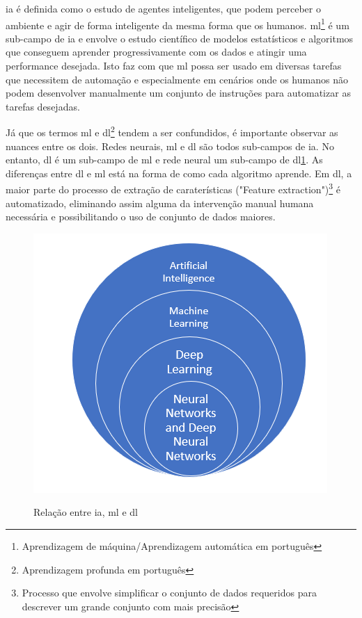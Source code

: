 \ac{ia} é definida como o estudo de agentes inteligentes, que podem perceber o ambiente e agir de forma inteligente da mesma forma que os humanos.
\ac{ml}\footnote{Aprendizagem de máquina/Aprendizagem automática em português} é um sub-campo de \ac{ia} e envolve o estudo científico de modelos estatísticos e algoritmos que conseguem aprender progressivamente com os dados e atingir uma performance desejada.
Isto faz com que \ac{ml} possa ser usado em diversas tarefas que necessitem de automação e especialmente em cenários onde os humanos não podem desenvolver manualmente um conjunto de instruções para automatizar as tarefas desejadas. 

Já que os termos \ac{ml} e \ac{dl}\footnote{Aprendizagem profunda em português} tendem a ser confundidos, é importante observar as nuances entre os dois. Redes neurais, \ac{ml} e \ac{dl} são todos sub-campos de \ac{ia}. No entanto, \ac{dl} é um sub-campo de \ac{ml} e rede neural um sub-campo de \ac{dl}\ref{relation}. As diferenças entre \ac{dl} e \ac{ml} está na forma de como cada algoritmo aprende. Em \ac{dl}, a maior parte do processo de extração de caraterísticas ("Feature extraction")\footnote{Processo que envolve simplificar o conjunto de dados requeridos para descrever um grande conjunto com mais precisão} é automatizado, eliminando assim alguma da intervenção manual humana necessária e possibilitando o uso de conjunto de dados maiores. \cite{MLIBM}




\begin{figure}[H]
\centering
\includegraphics[scale=0.6]{figs/ai_relationship}
\caption{Relação entre \ac{ia}, \ac{ml} e \ac{dl} }\cite{imagemRelation}\label{relation}
\end{figure}



